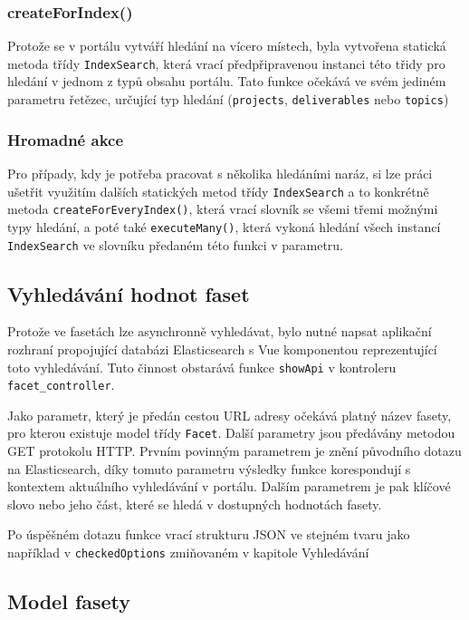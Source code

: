 \subsubsection*{createForIndex()}
Protože se v portálu vytváří hledání na vícero místech, byla vytvořena statická metoda třídy \texttt{IndexSearch}, která vrací předpřipravenou instanci této třidy pro hledání v jednom z typů obsahu portálu. Tato funkce očekává ve svém jediném parametru řetězec, určující typ hledání (\texttt{projects}, \texttt{deliverables} nebo \texttt{topics})

\subsubsection*{Hromadné akce}
Pro případy, kdy je potřeba pracovat s několika hledáními naráz, si lze práci ušetřit využitím dalších statických metod třídy \texttt{IndexSearch} a to konkrétně metoda \texttt{createForEveryIndex()}, která vrací slovník se všemi třemi možnými typy hledání, a poté také \texttt{executeMany()}, která vykoná hledání všech instancí \texttt{IndexSearch} ve slovníku předaném této funkci v parametru. 

\subsection{Vyhledávání hodnot faset}
Protože ve fasetách lze asynchronně vyhledávat, bylo nutné napsat aplikační rozhraní propojující databázi Elasticsearch s Vue komponentou reprezentující toto vyhledávání. Tuto činnost obstarává funkce \texttt{showApi} v kontroleru \texttt{facet\_controller}.

Jako parametr, který je předán cestou URL adresy očekává platný název fasety, pro kterou existuje model třídy \texttt{Facet}. Další parametry jsou předávány metodou GET protokolu HTTP. Prvním povinným parametrem je znění původního dotazu na Elasticsearch, díky tomuto parametru výsledky funkce korespondují s kontextem aktuálního vyhledávání v portálu. Dalším parametrem je pak klíčové slovo nebo jeho část, které se hledá v dostupných hodnotách fasety. 

Po úspěšném dotazu funkce vrací strukturu JSON ve stejném tvaru jako například v \texttt{checkedOptions} zmiňovaném v kapitole Vyhledávání %

\subsection{Model fasety}
\blindtext[2]